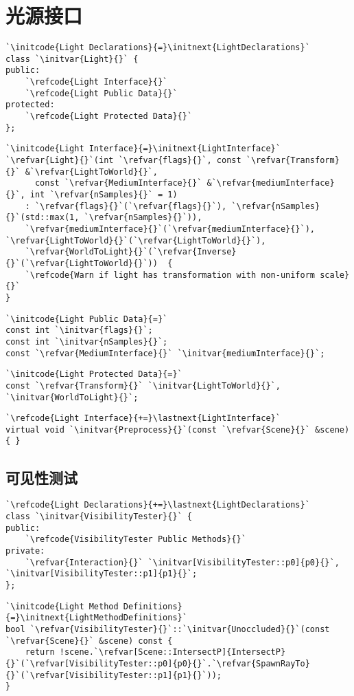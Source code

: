 \section{光源接口}\label{sec:光源接口}

\begin{lstlisting}
`\initcode{Light Declarations}{=}\initnext{LightDeclarations}`
class `\initvar{Light}{}` {
public:
    `\refcode{Light Interface}{}`
    `\refcode{Light Public Data}{}`
protected:
    `\refcode{Light Protected Data}{}`
};
\end{lstlisting}

\begin{lstlisting}
`\initcode{Light Interface}{=}\initnext{LightInterface}`
`\refvar{Light}{}`(int `\refvar{flags}{}`, const `\refvar{Transform}{}` &`\refvar{LightToWorld}{}`,
      const `\refvar{MediumInterface}{}` &`\refvar{mediumInterface}{}`, int `\refvar{nSamples}{}` = 1)
    : `\refvar{flags}{}`(`\refvar{flags}{}`), `\refvar{nSamples}{}`(std::max(1, `\refvar{nSamples}{}`)),
    `\refvar{mediumInterface}{}`(`\refvar{mediumInterface}{}`), `\refvar{LightToWorld}{}`(`\refvar{LightToWorld}{}`),
    `\refvar{WorldToLight}{}`(`\refvar{Inverse}{}`(`\refvar{LightToWorld}{}`))  { 
    `\refcode{Warn if light has transformation with non-uniform scale}{}`
}
\end{lstlisting}

\begin{lstlisting}
`\initcode{Light Public Data}{=}`
const int `\initvar{flags}{}`;
const int `\initvar{nSamples}{}`;
const `\refvar{MediumInterface}{}` `\initvar{mediumInterface}{}`;
\end{lstlisting}

\begin{lstlisting}
`\initcode{Light Protected Data}{=}`
const `\refvar{Transform}{}` `\initvar{LightToWorld}{}`, `\initvar{WorldToLight}{}`;
\end{lstlisting}

\begin{lstlisting}
`\refcode{Light Interface}{+=}\lastnext{LightInterface}`
virtual void `\initvar{Preprocess}{}`(const `\refvar{Scene}{}` &scene) { }
\end{lstlisting}

\subsection{可见性测试}\label{sub:可见性测试}
\begin{lstlisting}
`\refcode{Light Declarations}{+=}\lastnext{LightDeclarations}`
class `\initvar{VisibilityTester}{}` {
public:
    `\refcode{VisibilityTester Public Methods}{}`
private:
    `\refvar{Interaction}{}` `\initvar[VisibilityTester::p0]{p0}{}`, `\initvar[VisibilityTester::p1]{p1}{}`;
};
\end{lstlisting}
\begin{lstlisting}
`\initcode{Light Method Definitions}{=}\initnext{LightMethodDefinitions}`
bool `\refvar{VisibilityTester}{}`::`\initvar{Unoccluded}{}`(const `\refvar{Scene}{}` &scene) const {
    return !scene.`\refvar[Scene::IntersectP]{IntersectP}{}`(`\refvar[VisibilityTester::p0]{p0}{}`.`\refvar{SpawnRayTo}{}`(`\refvar[VisibilityTester::p1]{p1}{}`));
}
\end{lstlisting}